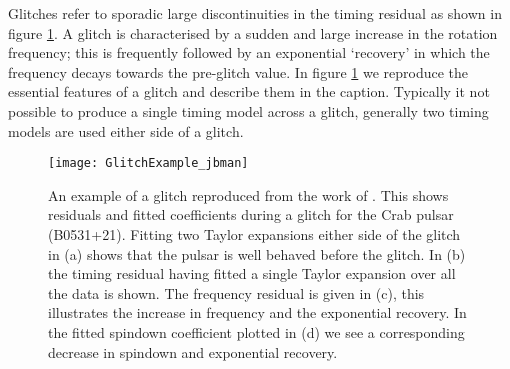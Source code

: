 Glitches refer to sporadic large discontinuities in the timing residual as
shown in figure \ref{fig: glitch}.  A glitch is characterised by a sudden and
large increase in the rotation frequency; this is frequently followed by an
exponential `recovery' in which the frequency decays towards the pre-glitch
value. In figure \ref{fig: glitch} we reproduce the essential features of a
glitch and describe them in the caption.  Typically it not possible to produce
a single timing model across a glitch, generally two timing models are used 
either side of a glitch.

\begin{figure}[ htb]
    \centering
    \texttt{[image: GlitchExample\_jbman]}
    \caption{An example of a glitch reproduced from the work of 
            \citet{Espinoza2011}. This shows residuals and fitted coefficients 
            during a glitch for the Crab pulsar (B0531+21). Fitting two Taylor
            expansions either side of the glitch in (a) shows that the pulsar is
            well behaved before the glitch. In (b) the timing residual having 
            fitted a single Taylor expansion over all the data is shown. The 
            frequency residual is given in (c), this illustrates the increase in 
            frequency and the exponential recovery. In the fitted spindown 
            coefficient  plotted in (d) we see a corresponding decrease in spindown
            and exponential recovery.}
    \label{fig: glitch}
\end{figure} 


